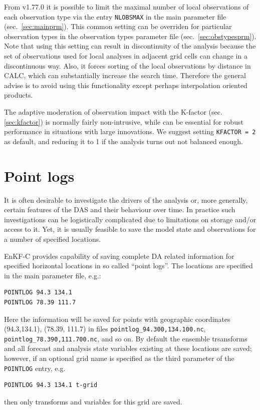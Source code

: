 \documentclass[11pt]{report}
\begin{document}
From v1.77.0 it is possible to limit the maximal number of local observations of each observation type via the entry \verb|NLOBSMAX| in the main parameter file (sec.~\ref{sec:mainprm}).
This common setting can be overriden for particular observation types in the observation types parameter file (sec.~\ref{sec:obstypesprm}).
Note that using this setting can result in discontinuity of the analysis because the set of observations used for local analyses in adjacent grid cells can change in a discontinuous way.
Also, it forces sorting of the local observations by distance in CALC, which can substantially increase the search time.
Therefore the general advise is to avoid using this functionality except perhaps interpolation oriented products.

The adaptive moderation of observation impact with the K-factor (sec. \ref{sec:kfactor}) is normally fairly non-intrusive, while can be essential for robust performance in situations with large innovations.
We suggest setting \verb|KFACTOR = 2| as default, and reducing it to 1 if the analysis turns out not balanced enough.

\section{Point logs}
\label{sec:pointlogs}

It is often desirable to investigate the drivers of the analysis or, more generally, certain features of the DAS and their behaviour over time.
In practice such investigations can be logistically complicated due to limitations on storage and/or access to it.
Yet, it is usually feasible to save the model state and observations for a number of specified locations.

EnKF-C provides capability of saving complete DA related information for specified horizontal locations in so called ``point logs''.
The locations are specified in the main parameter file, e.g.:
\begin{Verbatim}
POINTLOG 94.3 134.1
POINTLOG 78.39 111.7
\end{Verbatim}
Here the information will be saved for points with geographic coordinates (94.3,134.1), (78.39, 111.7) in files \verb|pointlog_94.300,134.100.nc|, \verb|pointlog_78.390,111.700.nc|, and so on.
By default the ensemble trsansforms and all forecast and analysis state variables existing at these locations are saved; however, if an optional grid name is specified as the third parameter of the \verb|POINTLOG| entry, e.g.
\begin{Verbatim}
POINTLOG 94.3 134.1 t-grid
\end{Verbatim}
then only transforms and variables for this grid are saved.
\end{document}
